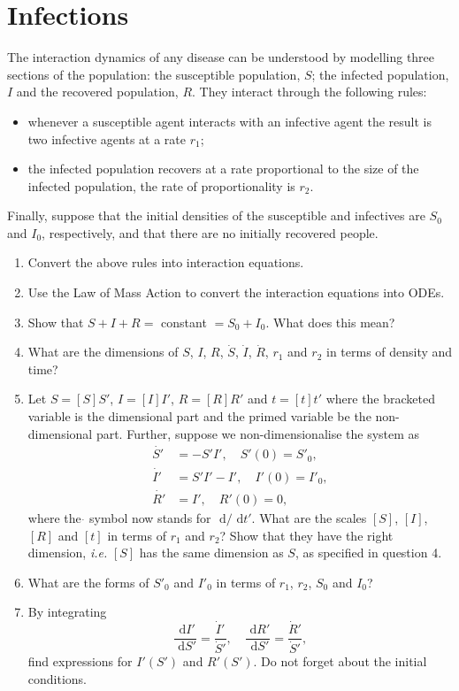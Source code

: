 \documentclass[]{article}
\newcommand{\bb}{\begin{equation}}
\newcommand{\ee}{\end{equation}}
\newcommand{\rd}{\text{ d}}
\newcommand{\ie}{\emph{i.e.} }
\begin{document}
\section{Infections}\label{Infections}
The interaction dynamics of any disease can be understood by modelling three sections of the population: the susceptible population, $S$; the infected population, $I$ and the recovered population, $R$. They interact through the following rules:
\begin{itemize}
\item whenever a susceptible agent interacts with an infective agent the result is two infective agents at a rate $r_1$;
\item the infected population recovers at a rate proportional to the size of the infected population, the rate of proportionality is $r_2$.
\end{itemize}
Finally, suppose that the initial densities of the susceptible and infectives are $S_0$ and $I_0$, respectively, and that there are no initially recovered people.
\begin{enumerate}
\item Convert the above rules into interaction equations.
\item Use the Law of Mass Action to convert the interaction equations into ODEs.
\item Show that $S+I+R=$ constant $=S_0+I_0$. What does this mean?
\item What are the dimensions of $S$, $I$, $R$, $\dot{S}$, $\dot{I}$, $\dot{R}$, $r_1$ and $r_2$ in terms of density and time?
\item Let $S=[S]S'$, $I=[I]I'$, $R=[R]R'$ and $t=[t]t'$ where the bracketed variable is the dimensional part and the primed variable be the non-dimensional part. Further, suppose  we non-dimensionalise the system as
\begin{align}
\dot{S'}&=-S'I',\quad S'(0)=S'_0,\nonumber\\
\dot{I'}&=S'I'-I',\quad I'(0)=I'_0,\nonumber\\
\dot{R'}&=I',\quad R'(0)=0,\nonumber
\end{align}
where the $\dot{}$ symbol now stands for $\rd/\rd t'$. What are the scales $[S]$, $[I]$, $[R]$ and $[t]$ in terms of $r_1$ and $r_2$? Show that they have the right dimension, \ie $[S]$ has the same dimension as $S$, as specified in question 4.
\item What are the forms of $S'_0$ and $I'_0$ in terms of $r_1$, $r_2$, $S_0$ and $I_0$?
\item By integrating
\bb
\frac{\rd I'}{\rd S'}=\frac{\dot{I}'}{\dot{S}'},\quad \frac{\rd R'}{\rd S'}=\frac{\dot{R}'}{\dot{S}'},
\ee
find expressions for $I'(S')$ and $R'(S')$. Do not forget about the initial conditions.
\end{enumerate}
\end{document}
